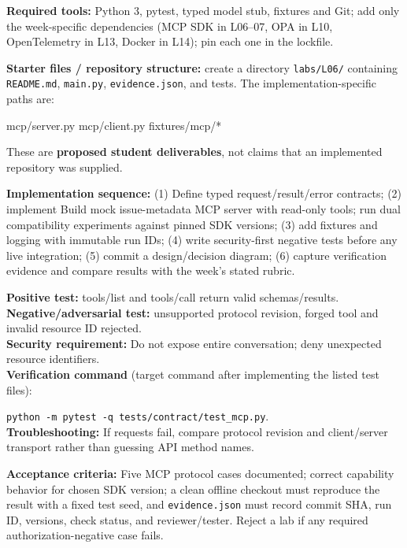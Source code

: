 \documentclass[
  10pt,
]{article}
\newenvironment{Shaded}{\begin{snugshade}}{\end{snugshade}}
\newcommand{\NormalTok}[1]{#1}
\begin{document}
\textbf{Required tools:} Python 3, pytest, typed model stub, fixtures
and Git; add only the week-specific dependencies (MCP SDK in L06--07,
OPA in L10, OpenTelemetry in L13, Docker in L14); pin each one in the
lockfile.

{\raggedright \textbf{Starter files / repository structure:} create a directory
\texttt{labs/\allowbreak L06/} containing \texttt{README.md}, \texttt{main.py},
\texttt{evidence.json}, and tests. The implementation-specific paths
are:\par}

\begin{Shaded}
\begin{Highlighting}[]
\NormalTok{mcp/server.py}
\NormalTok{mcp/client.py}
\NormalTok{fixtures/mcp/*}
\end{Highlighting}
\end{Shaded}

These are \textbf{proposed student deliverables}, not claims that an
implemented repository was supplied.

{\raggedright \textbf{Implementation sequence:} (1) Define typed request/\allowbreak result/\allowbreak error
contracts; (2) implement Build mock issue-metadata MCP server with
read-only tools; run dual compatibility experiments against pinned SDK
versions; (3) add fixtures and logging with immutable run IDs; (4) write
security-first negative tests before any live integration; (5) commit a
design/\allowbreak decision diagram; (6) capture verification evidence and compare
results with the week's stated rubric.\par}

\textbf{Positive test:} tools/list and tools/call return valid
schemas/results.\\
\textbf{Negative/adversarial test:} unsupported protocol revision,
forged tool and invalid resource ID rejected.\\
\textbf{Security requirement:} Do not expose entire conversation; deny
unexpected resource identifiers.\\
\textbf{Verification command} (target command after implementing the
listed test files):\par\noindent
\texttt{python\ -m\ pytest\ -q\ tests/contract/test\_mcp.py}.\\
\textbf{Troubleshooting:} If requests fail, compare protocol revision
and client/server transport rather than guessing API method names.

\textbf{Acceptance criteria:} Five MCP protocol cases documented;
correct capability behavior for chosen SDK version; a clean offline
checkout must reproduce the result with a fixed test seed, and
\texttt{evidence.json} must record commit SHA, run ID, versions, check
status, and reviewer/tester. Reject a lab if any required
authorization-negative case fails.
\end{document}
